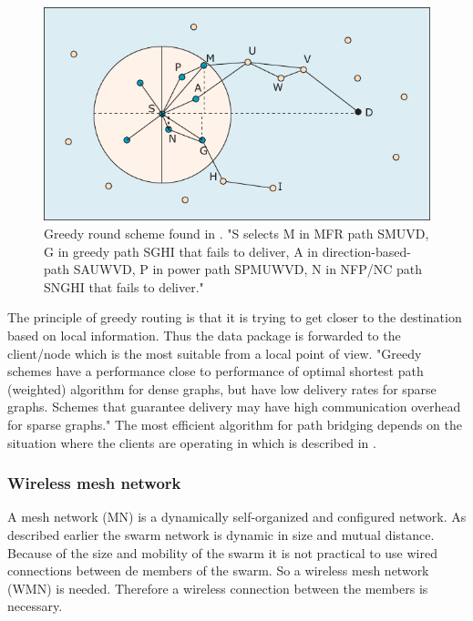 \documentclass[10pt,a4paper]{article}
\begin{document}
\begin{figure}[H]
   \centering
   \includegraphics[width=1\textwidth]{greedyrouting}
   \caption{Greedy round scheme found in \cite{position-based}. "S selects M in MFR path SMUVD, G in greedy path SGHI that
fails to deliver, A in direction-based-path SAUWVD, P in power path
SPMUWVD, N in NFP/NC path SNGHI that fails to deliver."}
   \label{fig:greedyrouting}
\end{figure}

The principle of greedy routing is that it is trying to get closer to the destination based on local information. Thus the data package is forwarded to the client/node which is the most suitable from a local point of view. \cite{geographicrouting} "Greedy schemes have a performance close to performance of optimal shortest path (weighted) algorithm for dense graphs, but have low delivery rates for sparse graphs. Schemes that guarantee delivery may have high communication overhead for sparse graphs." \cite{position-based} The most efficient algorithm for path bridging depends on the situation where the clients are operating in which is described in \cite{position-based}.


\subsubsection{Wireless mesh network}
A mesh network (MN) is a dynamically self-organized and configured network. \cite{WMN1} As described earlier the swarm network is dynamic in size and mutual distance. Because of the size and mobility of the swarm it is not practical to use wired connections between de members of the swarm. So a wireless mesh network (WMN) is needed. Therefore a wireless connection between the members is necessary.
\end{document}

